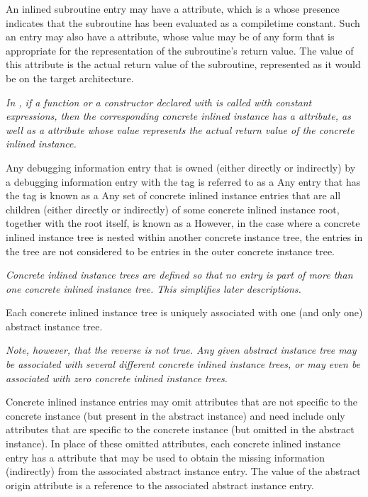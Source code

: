 An inlined subroutine entry may have
a\hypertarget{chap:DWATconstexprcompiletimeconstantfunction}{}
\DWATconstexprDEFN{} attribute, 
which is a  
whose presence indicates that the
subroutine has been evaluated as a compile\dash time constant. Such
an entry may also have a \DWATconstvalue{} attribute,
whose value may be of any form that is appropriate for the
representation of the subroutine's return value. The value of
this attribute is the actual return value of the subroutine,
represented as it would be on the target architecture.

\textit{In , if a function or a constructor declared with 
is called with constant expressions, then the corresponding
concrete inlined instance has a 
\DWATconstexpr{} attribute,
as well as a \DWATconstvalue{} attribute whose value represents
the actual return value of the concrete inlined instance.}

Any debugging information entry that is owned (either
directly or indirectly) by a debugging information entry
with the tag \DWTAGinlinedsubroutine{} is referred to as a
 Any entry that has
the tag 
\DWTAGinlinedsubroutine{} 
is known as a  
Any set of concrete inlined instance
entries that are all children (either directly or indirectly)
of some concrete inlined instance root, together with the root
itself, is known as a 
However, in the case where a concrete inlined instance tree
is nested within another concrete instance tree, the entries
in the  tree 
are not considered to
be entries in the outer concrete instance tree.

\textit{Concrete inlined instance trees are defined so that no entry
is part of more than one concrete inlined instance tree. This
simplifies later descriptions.}

Each concrete inlined instance tree is uniquely associated
with one (and only one) abstract instance tree.

\textit{Note, however, that the reverse is not true. Any given abstract
instance tree may be associated with several different concrete
inlined instance trees, or may even be associated with zero
concrete inlined instance trees.}

Concrete inlined instance entries may omit attributes that
are not specific to the concrete instance (but present in
the abstract instance) and need include only attributes that
are specific to the concrete instance (but omitted in the
abstract instance). In place of these omitted attributes, 
each\hypertarget{chap:DWATabstractorigininlineinstance}{}
concrete inlined instance entry has a
\DWATabstractoriginDEFN{}
attribute that may be used to obtain the missing information
(indirectly) from the associated abstract instance entry. The
value of the abstract origin attribute is a reference to the
associated abstract instance entry.

